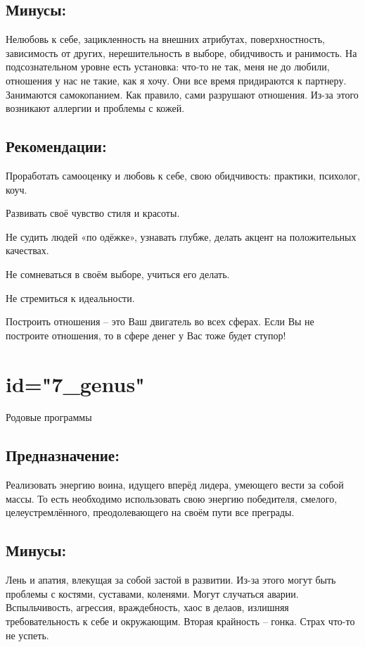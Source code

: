 \subsection{Минусы:}
Нелюбовь к себе, зацикленность на внешних атрибутах, поверхностность, 
зависимость от других, нерешительность в выборе, обидчивость и 
ранимость.
На подсознательном уровне есть установка: что-то не так, меня не 
до любили, отношения у нас не такие, как я хочу. Они все время 
придираются к партнеру. Занимаются самокопанием. Как правило, 
сами разрушают отношения.
Из-за этого возникают аллергии и проблемы с кожей.
\endsubsection

\subsection{Рекомендации:}
\item Проработать самооценку и любовь к себе, свою обидчивость: 
практики, психолог, коуч.
\item Развивать своё чувство стиля и красоты.
\item Не судить людей «по одёжке», узнавать глубже, делать акцент 
на положительных качествах.
\item Не сомневаться в своём выборе, учиться его делать.
\item Не стремиться к идеальности.
\item Построить отношения – это Ваш двигатель во всех сферах.
Если Вы не построите отношения, то в сфере денег у Вас тоже будет 
ступор!
\endsubsection

\endsection

\section{id="7_genus"}{Родовые программы}

\subsection{Предназначение:}
Реализовать энергию воина, идущего вперёд лидера, умеющего вести 
за собой массы. То есть необходимо использовать свою энергию 
победителя, смелого, целеустремлённого, преодолевающего на своём 
пути все преграды.
\endsubsection

\subsection{Минусы:}
Лень и апатия, влекущая за собой застой в развитии. Из-за этого 
могут быть проблемы с костями, суставами, коленями. Могут случаться 
аварии.
Вспыльчивость, агрессия, враждебность, хаос в делаов, излишняя 
требовательность к себе и окружающим.
Вторая крайность – гонка. Страх что-то не успеть.
\endsubsection

